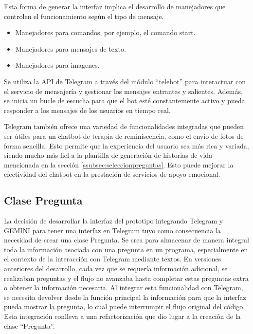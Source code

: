 Esta forma de generar la interfaz implica el desarrollo de manejadores que controlen el funcionamiento según el tipo de mensaje. 

\begin{itemize}
	\item Manejadores para comandos, por ejemplo, el comando start.
	
	\item Manejadores para mensajes de texto.
	
	\item Manejadores para imagenes. 
\end{itemize}

Se utiliza la API de Telegram a través del módulo ``telebot'' para interactuar con el servicio de mensajería y gestionar los mensajes entrantes y salientes. Además, se inicia un bucle de escucha para que el bot esté constantemente activo y pueda responder a los mensajes de los usuarios en tiempo real.

Telegram también ofrece una variedad de funcionalidades integradas que pueden ser útiles para un chatbot de terapia de reminiscencia, como el envío de fotos de forma sencilla. Esto permite que la experiencia del usuario sea más rica y variada, siendo mucho más fiel a la plantilla de generación de historias de vida mencionada en la sección \ref{ssubsec:seleccionpreguntas}. Esto puede mejorar la efectividad del chatbot en la prestación de servicios de apoyo emocional.

\subsection{Clase Pregunta}
La decisión de desarrollar la interfaz del prototipo integrando Telegram y GEMINI para tener una interfaz en Telegram tuvo como consecuencia la necesidad de crear una clase Pregunta. Se crea para almacenar de manera integral toda la información asociada con una pregunta en un programa, especialmente en el contexto de la interacción con Telegram mediante textos. En versiones anteriores del desarrollo, cada vez que se requería información adicional, se realizaban preguntas y el flujo no avanzaba hasta completar estas preguntas extra o obtener la información necesaria. Al integrar esta funcionalidad con Telegram, se necesita devolver desde la función principal la información para que la interfaz pueda mostrar la pregunta, lo cual puede interrumpir el flujo original del código. Esta integración conlleva a una refactorización que dio lugar a la creación de la clase ``Pregunta''.

